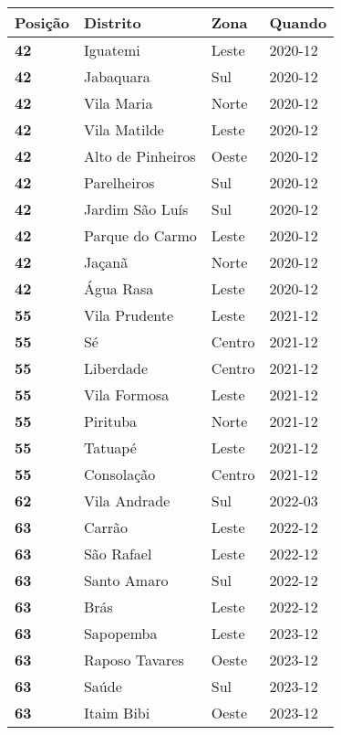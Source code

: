 \begin{table}[H]
	\centering
	\begin{tabular}{l|l|l|l}
	\textbf{Posição} & \textbf{Distrito} & \textbf{Zona} & \textbf{Quando} \\ \hline
		\textbf{42} & Iguatemi & Leste & 2020-12\\ \hline
		\textbf{42} & Jabaquara & Sul & 2020-12\\ \hline
		\textbf{42} & Vila Maria & Norte & 2020-12\\ \hline
		\textbf{42} & Vila Matilde & Leste & 2020-12\\ \hline
		\textbf{42} & Alto de Pinheiros & Oeste & 2020-12\\ \hline
		\textbf{42} & Parelheiros & Sul & 2020-12\\ \hline
		\textbf{42} & Jardim São Luís & Sul & 2020-12\\ \hline
		\textbf{42} & Parque do Carmo & Leste & 2020-12\\ \hline
		\textbf{42} & Jaçanã & Norte & 2020-12\\ \hline
		\textbf{42} & Água Rasa & Leste & 2020-12\\ \hline
		\textbf{55} & Vila Prudente & Leste & 2021-12\\ \hline
		\textbf{55} & Sé & Centro & 2021-12\\ \hline
		\textbf{55} & Liberdade & Centro & 2021-12\\ \hline
		\textbf{55} & Vila Formosa & Leste & 2021-12\\ \hline
		\textbf{55} & Pirituba & Norte & 2021-12\\ \hline
		\textbf{55} & Tatuapé & Leste & 2021-12\\ \hline
		\textbf{55} & Consolação & Centro & 2021-12\\ \hline
		\textbf{62} & Vila Andrade & Sul & 2022-03\\ \hline
		\textbf{63} & Carrão & Leste & 2022-12\\ \hline
		\textbf{63} & São Rafael & Leste & 2022-12\\ \hline
		\textbf{63} & Santo Amaro & Sul & 2022-12\\ \hline
		\textbf{63} & Brás & Leste & 2022-12\\ \hline
		\textbf{63} & Sapopemba & Leste & 2023-12\\ \hline
		\textbf{63} & Raposo Tavares & Oeste & 2023-12\\ \hline
		\textbf{63} & Saúde & Sul & 2023-12\\ \hline
		\textbf{63} & Itaim Bibi & Oeste & 2023-12\\ \hline

\end{tabular}
\end{table}
